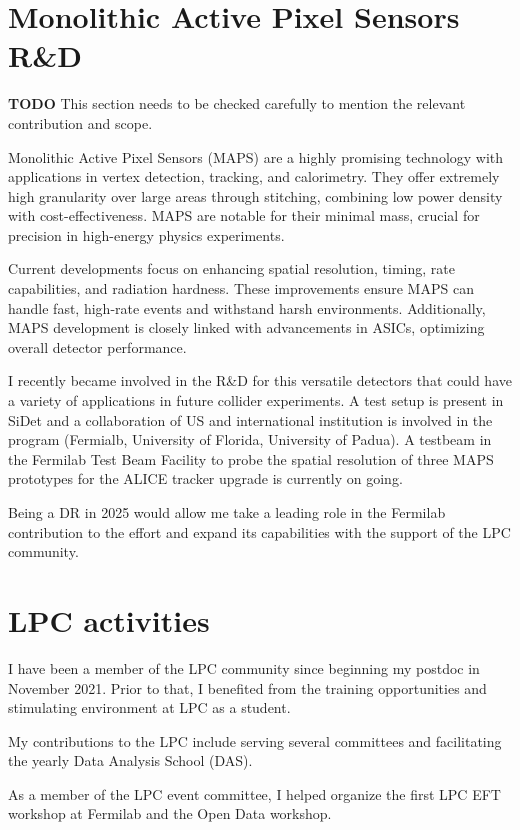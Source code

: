 {\begin{flushleft}
\vspace{\baselineskip}
\section{Monolithic Active Pixel Sensors R\&D}
{\bf TODO} This section needs to be checked carefully to mention the relevant contribution and scope.


Monolithic Active Pixel Sensors (MAPS) are a highly promising technology with applications in vertex detection, tracking, and calorimetry. They offer extremely high granularity over large areas through stitching, combining low power density with cost-effectiveness. MAPS are notable for their minimal mass, crucial for precision in high-energy physics experiments.

Current developments focus on enhancing spatial resolution, timing, rate capabilities, and radiation hardness. These improvements ensure MAPS can handle fast, high-rate events and withstand harsh environments. Additionally, MAPS development is closely linked with advancements in ASICs, optimizing overall detector performance.

I recently became involved in the R\&D for this versatile detectors that could have a variety of applications in future collider experiments. A test setup is present in SiDet and a collaboration of US and international institution is involved in the program (Fermialb, University of Florida, University of Padua). A testbeam in the Fermilab Test Beam Facility to probe the spatial resolution of three MAPS prototypes for the ALICE tracker upgrade is currently on going. 

Being a DR in 2025 would allow me take a leading role in the Fermilab contribution to the effort and expand its capabilities with the support of the LPC community.


 
\section{LPC activities}
\vspace{\baselineskip}
I have been a member of the LPC community since beginning my postdoc in November 2021. Prior to that, I benefited from the training opportunities and stimulating environment at LPC as a student.

My contributions to the LPC include serving several committees and facilitating the yearly Data Analysis School (DAS). 

As a member of the LPC event committee, I helped organize the first LPC EFT workshop at Fermilab and the Open Data workshop. 


\end{flushleft}}
